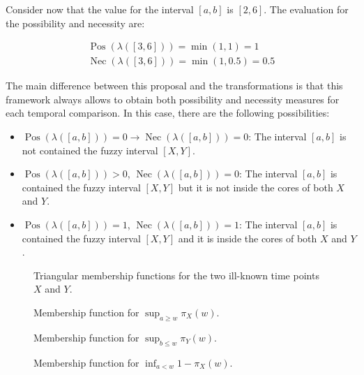 \documentclass[twoside,twocolumn,a4paper]{article}
\newcommand{\Pos}{\operatorname{Pos}}
\newcommand{\Nec}{\operatorname{Nec}}
\begin{document}
Consider now that the value for the interval $\left[a, b \right]$ is $\left[2, 6 \right]$. The evaluation for the possibility and necessity are:

\begin{eqnarray}
\nonumber
\Pos\left(\lambda([3,6])\right)=\min(1,1)= 1\\
\nonumber
\Nec\left(\lambda([3,6])\right)=\min(1,0.5 ) = 0.5
\end{eqnarray}

The main difference between this proposal and the transformations is that this framework always allows to obtain both possibility and necessity measures for each temporal comparison. In this case, there are the following possibilities:

\begin{itemize}
\item
$\Pos(\lambda([a,b])) = 0 \rightarrow \Nec(\lambda([a,b])) = 0$: The interval $[a,b]$ is not contained the fuzzy interval $[X,Y]$.
\item
$\Pos(\lambda([a,b])) > 0 $, $\Nec(\lambda([a,b])) = 0$: The interval $[a,b]$ is contained the fuzzy interval $[X,Y]$ but it is not inside the cores of both $X$ and $Y$.
\item
$\Pos(\lambda([a,b])) = 1 $, $\Nec(\lambda([a,b])) = 1$: The interval $[a,b]$ is contained the fuzzy interval $[X,Y]$ and it is inside the cores of both $X$ and $Y$.
\end{itemize}

\begin{figure}[h!]
\centering

\caption{Triangular membership functions for the two ill-known time points $X$ and $Y$.}
\label{fig:interval-rep}
\end{figure}

\begin{figure}[h!]
\centering

\caption{Membership function for $\sup_{a\geq w}\pi_{X}(w)$.}
\label{fig:interval_membership_pos_a}
\end{figure}

\begin{figure}[h!]
\centering

\caption{Membership function for $\sup_{b\leq w}\pi_{Y}(w)$.}
\label{fig:interval_membership_pos_b}
\end{figure}

\begin{figure}[h!]
\centering

\caption{Membership function for $\inf_{a<w}1-\pi_{X}(w)$.}
\label{fig:interval_membership_nec_a}
\end{figure}
\end{document}
